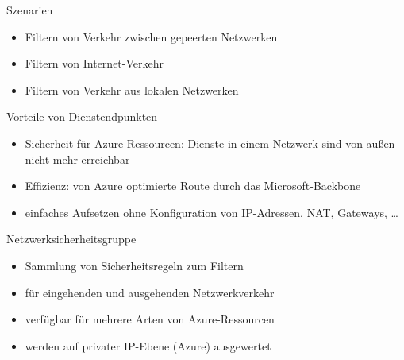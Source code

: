 \begin{flashcard}[]{Szenarien}
  \begin{itemize}
    \item Filtern von Verkehr zwischen gepeerten Netzwerken
    \item Filtern von Internet-Verkehr
    \item Filtern von Verkehr aus lokalen Netzwerken
  \end{itemize}
\end{flashcard}

\begin{flashcard}[]{Vorteile von Dienstendpunkten}
  \begin{itemize}
    \item Sicherheit für Azure-Ressourcen:\newline
      Dienste in einem Netzwerk sind von außen nicht mehr erreichbar
    \item Effizienz:\newline
      von Azure optimierte Route durch das Microsoft-Backbone
    \item einfaches Aufsetzen ohne Konfiguration von IP-Adressen, NAT, Gateways, \ldots
  \end{itemize}
\end{flashcard}


\begin{flashcard}[]{Netzwerksicherheitsgruppe}
  \begin{itemize}
    \item Sammlung von Sicherheitsregeln zum Filtern
    \item für eingehenden und ausgehenden Netzwerkverkehr
    \item verfügbar für mehrere Arten von Azure-Ressourcen
    \item werden auf privater IP-Ebene (Azure) ausgewertet
  \end{itemize}
\end{flashcard}

